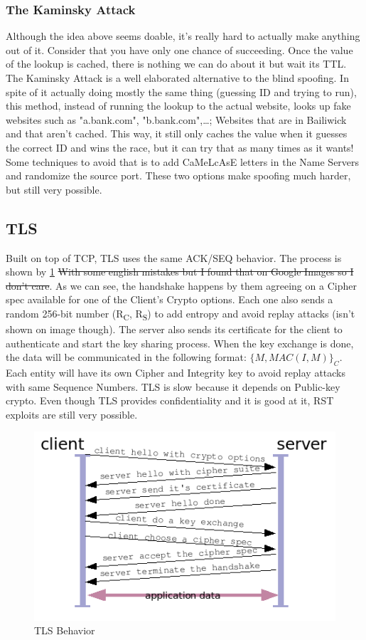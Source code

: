 \documentclass[11pt]{article}
\begin{document}
{\subsubsection{The Kaminsky Attack}
\label{sec:org96d88cd}
Although the idea above seems doable, it's really hard to actually make anything out of it. Consider that you have only one chance of succeeding. Once the value of the lookup is cached, there is nothing we can do about it but wait its TTL. The Kaminsky Attack is a well elaborated alternative to the blind spoofing. In spite of it actually doing mostly the same thing (guessing ID and trying to run), this method, instead of running the lookup to the actual website, looks up fake websites such as "a.bank.com", "b.bank.com",\ldots{}; Websites that are in Bailiwick and that aren't cached. This way, it still only caches the value when it guesses the correct ID and wins the race, but it can try that as many times as it wants! Some techniques to avoid that is to add CaMeLcAsE letters in the Name Servers and randomize the source port. These two options make spoofing much harder, but still very possible.

\subsection{TLS}
\label{sec:org78ff2f8}
Built on top of TCP, TLS uses the same ACK/SEQ behavior. The process is shown by \ref{TLS} \sout{With some english mistakes but I found that on Google Images so I don't care}. As we can see, the handshake happens by them agreeing on a Cipher spec available for one of the Client's Crypto options. Each one also sends a random 256-bit number (R\textsubscript{C}, R\textsubscript{S}) to add entropy and avoid replay attacks (isn't shown on image though). The server also sends its certificate for the client to authenticate and start the key sharing process. When the key exchange is done, the data will be communicated in the following format: \(\{M,MAC(I, M)\}_C\). Each entity will have its own Cipher and Integrity key to avoid replay attacks with same Sequence Numbers. TLS is slow because it depends on Public-key crypto. Even though TLS provides confidentiality and it is good at it, RST exploits are still very possible.

\begin{figure}[htbp]
\centering
\includegraphics[height=0.5\textwidth]{res/TLS.png}
\caption{\label{TLS}
TLS Behavior}
\end{figure}

}
\end{document}
